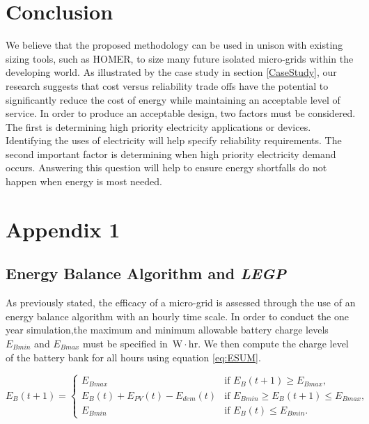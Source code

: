 \documentclass[11p]{article}
\newcommand{\unit}[1]{\ensuremath{\, \mathrm{#1}}}
\begin{document}
\section{Conclusion}

We believe that the proposed methodology can be used in unison with existing sizing tools, such as HOMER, to size many future isolated micro-grids within the developing world.
As illustrated by the case study in section \ref{CaseStudy}, our research suggests that cost versus reliability trade offs have the potential to significantly reduce the cost of energy while maintaining an acceptable level of service.
In order to produce an acceptable design, two factors must be considered.
The first is determining high priority electricity applications or devices. 
Identifying the uses of electricity will help specify reliability requirements.
The second important factor is determining when high priority electricity demand occurs. 
Answering this question will help to ensure energy shortfalls do not happen when energy is most needed.



\appendix	
\section{Appendix 1} \label{A1}

\subsection{Energy Balance Algorithm and \emph{LEGP}}

As previously stated, the efficacy of a micro-grid is assessed through the use of an energy balance algorithm with an hourly time scale. 
In order to conduct the one year simulation,the maximum and minimum allowable battery charge levels $E_{Bmin}$ and $E_{Bmax}$ must be specified in \unit{W\! \cdot \! hr}.
We then compute the charge level of the battery bank for all hours using equation \ref{eq:ESUM}. 

\begin{equation} \label{eq:ESUM}
E_B(t+1) =
\begin{cases}
E_{Bmax} & \text{if } E_B(t+1) \geq E_{Bmax},\\
E_B (t) + E_{PV} (t) - E_{dem} (t) & \text{if } E_{Bmin}\geq E_B(t+1)\leq E_{Bmax},\\
E_{Bmin} & \text{if } E_B(t) \leq E_{Bmin}.
\end{cases}
\end{equation}
\end{document}
